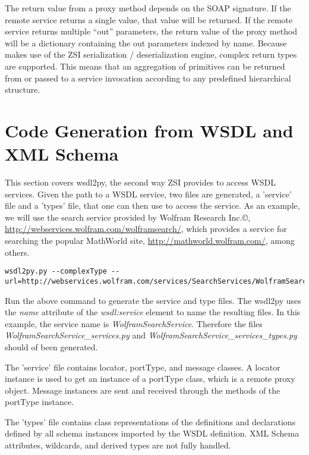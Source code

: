 The return value from a proxy method depends on the SOAP signature. If the 
remote service returns a single value, that value will be returned. If the 
remote service returns multiple ``out'' parameters, the return value of the 
proxy method will be a dictionary containing the out parameters indexed by 
name.  Because  makes use of the ZSI serialization / 
deserialization engine, complex return types are supported.  This means 
that an aggregation of primitives can be returned from or passed to a service
invocation according to any predefined hierarchical structure.


\section{Code Generation from WSDL and XML Schema}

This section covers wsdl2py, the second way ZSI provides to access WSDL
services.  Given the path to a WSDL service, two files are generated, a 
'service' file and a 'types' file, that one can then use to access the
service.  As an example, we will use the search service provided by Wolfram
Research Inc.\copyright{}, \url{http://webservices.wolfram.com/wolframsearch/}, 
which provides a service for searching the popular MathWorld site, 
\url{http://mathworld.wolfram.com/}, among others.

\begin{verbatim}
wsdl2py.py --complexType --url=http://webservices.wolfram.com/services/SearchServices/WolframSearch2.wsdl
\end{verbatim}

Run the above command to generate the service and type files.  The wsdl2py uses
the {\it name} attribute of the {\it wsdl:service} element to name the resulting files.
In this example, the service name is {\it WolframSearchService}.  Therefore the files
{\it WolframSearchService_services.py} and {\it WolframSearchService_services_types.py}
should of been generated.

The 'service' file contains locator, portType, and message classes.  
A locator instance is used to get an instance of a portType class, 
which is a remote proxy object. Message instances are sent and received 
through the methods of the portType instance.

The 'types' file contains class representations of the definitions and
declarations defined by all schema instances imported by the WSDL definition.
XML Schema attributes, wildcards, and derived types are not fully
handled.

